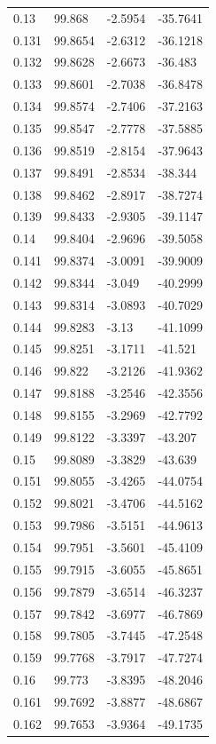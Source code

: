 \begin{tabular}{llll}
0.13 & 99.868 & -2.5954 & -35.7641 \\
0.131 & 99.8654 & -2.6312 & -36.1218 \\
0.132 & 99.8628 & -2.6673 & -36.483 \\
0.133 & 99.8601 & -2.7038 & -36.8478 \\
0.134 & 99.8574 & -2.7406 & -37.2163 \\
0.135 & 99.8547 & -2.7778 & -37.5885 \\
0.136 & 99.8519 & -2.8154 & -37.9643 \\
0.137 & 99.8491 & -2.8534 & -38.344 \\
0.138 & 99.8462 & -2.8917 & -38.7274 \\
0.139 & 99.8433 & -2.9305 & -39.1147 \\
0.14 & 99.8404 & -2.9696 & -39.5058 \\
0.141 & 99.8374 & -3.0091 & -39.9009 \\
0.142 & 99.8344 & -3.049 & -40.2999 \\
0.143 & 99.8314 & -3.0893 & -40.7029 \\
0.144 & 99.8283 & -3.13 & -41.1099 \\
0.145 & 99.8251 & -3.1711 & -41.521 \\
0.146 & 99.822 & -3.2126 & -41.9362 \\
0.147 & 99.8188 & -3.2546 & -42.3556 \\
0.148 & 99.8155 & -3.2969 & -42.7792 \\
0.149 & 99.8122 & -3.3397 & -43.207 \\
0.15 & 99.8089 & -3.3829 & -43.639 \\
0.151 & 99.8055 & -3.4265 & -44.0754 \\
0.152 & 99.8021 & -3.4706 & -44.5162 \\
0.153 & 99.7986 & -3.5151 & -44.9613 \\
0.154 & 99.7951 & -3.5601 & -45.4109 \\
0.155 & 99.7915 & -3.6055 & -45.8651 \\
0.156 & 99.7879 & -3.6514 & -46.3237 \\
0.157 & 99.7842 & -3.6977 & -46.7869 \\
0.158 & 99.7805 & -3.7445 & -47.2548 \\
0.159 & 99.7768 & -3.7917 & -47.7274 \\
0.16 & 99.773 & -3.8395 & -48.2046 \\
0.161 & 99.7692 & -3.8877 & -48.6867 \\
0.162 & 99.7653 & -3.9364 & -49.1735 \\

\end{tabular}
